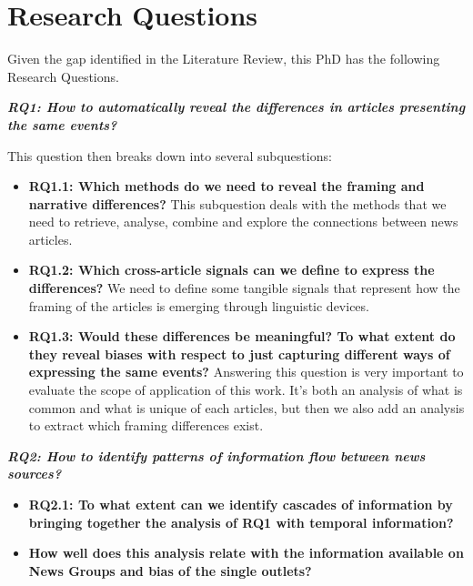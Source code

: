 \chapter{Research Questions}


Given the gap identified in the Literature Review, this PhD has the following Research Questions.

\vspace{12px}

\textit{\textbf{RQ1: How to automatically reveal the differences in articles presenting the same events?}}

\vspace{12px}

This question then breaks down into several subquestions:

\begin{itemize}
    \item \textbf{RQ1.1: Which methods do we need to reveal the framing and narrative differences?} This subquestion deals with the methods that we need to retrieve, analyse, combine and explore the connections between news articles.
    \item \textbf{RQ1.2: Which cross-article signals can we define to express the differences?} We need to define some tangible signals that represent how the framing of the articles is emerging through linguistic devices.
    \item \textbf{RQ1.3: Would these differences be meaningful? To what extent do they reveal biases with respect to just capturing different ways of expressing the same events?} Answering this question is very important to evaluate the scope of application of this work. It's both an analysis of what is common and what is unique of each articles, but then we also add an analysis to extract which framing differences exist.   
\end{itemize}


\vspace{12px}

\textit{\textbf{RQ2: How to identify patterns of information flow between news sources?}}

\vspace{12px}

\begin{itemize}
    \item \textbf{RQ2.1: To what extent can we identify cascades of information by bringing together the analysis of RQ1 with temporal information?}
    
    \item \textbf{How well does this analysis relate with the information available on News Groups and bias of the single outlets?}
    
\end{itemize}